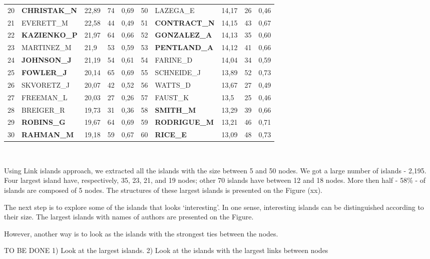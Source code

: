 \documentclass[11pt]{article} %
\begin{document}
\begin{table}
\begin{tabular}{c|l|p{1cm}|p{1cm}|p{1.5cm}||c|l|p{1cm}|p{1cm}|p{1.5cm}|}
20& 	\textbf{CHRISTAK\_N}& 	22,89& 	74& 	0,69& 	50& 	LAZEGA\_E& 	14,17& 	26& 	0,46\\
21& 	EVERETT\_M& 	22,58& 	44& 	0,49& 	51& 	\textbf{CONTRACT\_N}& 	14,15& 	43& 	0,67\\
22& 	\textbf{KAZIENKO\_P}& 	21,97& 	64& 	0,66& 	52& 	\textbf{GONZALEZ\_A}& 	14,13& 	35& 	0,60\\
23& 	MARTINEZ\_M& 	21,9& 	53& 	0,59& 	53& 	\textbf{PENTLAND\_A}& 	14,12& 	41& 	0,66\\
24& 	\textbf{JOHNSON\_J}& 	21,19& 	54& 	0,61& 	54& 	FARINE\_D& 	14,04& 	34& 	0,59\\
25& 	\textbf{FOWLER\_J}& 	20,14& 	65& 	0,69& 	55& 	SCHNEIDE\_J& 	13,89& 	52& 	0,73\\
26& 	SKVORETZ\_J& 	20,07& 	42& 	0,52& 	56& 	WATTS\_D& 	13,67& 	27& 	0,49\\
27& 	FREEMAN\_L& 	20,03& 	27& 	0,26& 	57& 	FAUST\_K& 	13,5& 	25& 	0,46\\
28& 	BREIGER\_R& 	19,73& 	31& 	0,36& 	58& 	\textbf{SMITH\_M}& 	13,29& 	39& 	0,66\\
29& 	\textbf{ROBINS\_G}& 	19,67& 	64& 	0,69& 	59& 	\textbf{RODRIGUE\_M}& 	13,21& 	46& 	0,71\\
30& 	\textbf{RAHMAN\_M}& 	19,18& 	59& 	0,67& 	60& 	\textbf{RICE\_E}& 	13,09& 	48& 	0,73\\
\end{tabular}\\
\end{table}

Using Link islands approach, we extracted all the islands with the size between 5 and 50 nodes. We got a large number of islands - 2,195. Four largest island have, respectively, 35, 23, 21, and 19 nodes; other 70 islands have between 12 and 18 nodes. More then half - 58\% - of islands are composed of 5 nodes. The structures of these largest islands is presented on the Figure (xx). \medskip


The next step is to explore some of the islands that looks `interesting'. In one sense, interesting islands can be distinguished according to their size. The largest islands with names of authors are presented on the Figure. \medskip

However, another way is to look as the islands with the strongest ties between the nodes. \medskip

TO BE DONE 
1) Look at the largest islands. 
2) Look at the islands with the largest links between nodes
\end{document}
